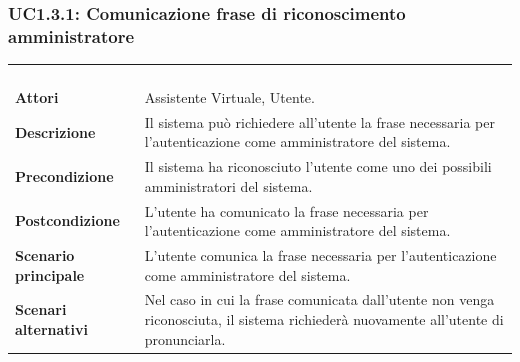 \subsubsection{UC1.3.1: Comunicazione frase di riconoscimento amministratore}
\label{UC1.3.1}
\begin{longtable}{l|p{10cm}}
	\rowcolor[gray]{0.8} \multicolumn{2}{c}{} \\
	\rowcolor[gray]{0.8} \multicolumn{2}{c}{\textbf{UC1.3.1 - Comunicazione frase di riconoscimento amministratore}} \\
	\rowcolor[gray]{0.8} \multicolumn{2}{c}{} \\
	\hline
	&\\
	\textbf{Attori} & Assistente Virtuale, Utente.\\[7pt]
	\textbf{Descrizione} & Il sistema può richiedere all'utente la frase necessaria per l'autenticazione come amministratore del sistema. \\[7pt]
	\textbf{Precondizione} & Il sistema ha riconosciuto l'utente come uno dei possibili amministratori del sistema.\\[7pt]
	\textbf{Postcondizione} & L'utente ha comunicato la frase necessaria per l'autenticazione come amministratore del sistema.\\[7pt]
	\textbf{Scenario principale} &L'utente comunica la frase necessaria per l'autenticazione come amministratore del sistema. \\[7pt]
	\textbf{Scenari alternativi} & Nel caso in cui la frase comunicata dall'utente non venga riconosciuta, il sistema richiederà nuovamente all'utente di pronunciarla.\\[7pt]\hline
\end{longtable}

